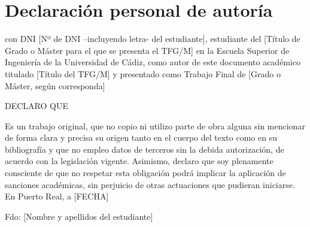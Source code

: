 \newpage{\ }
\thispagestyle{empty}

\clearpage\setcounter{page}{-1} %

\chapter*{Declaración personal de autoría}

\vspace{15mm}

 con DNI [Nº de DNI –incluyendo letra- del estudiante], estudiante del [Título de Grado o Máster para el que se presenta el TFG/M] en la Escuela Superior de Ingeniería de la Universidad de Cádiz, como autor de este documento académico titulado [Título del TFG/M] y presentado como Trabajo Final de [Grado o Máster, según corresponda]


\vspace{15mm}


DECLARO QUE \\
\vspace{1mm}

\noindent Es un trabajo original, que no copio ni utilizo parte de obra alguna sin mencionar de forma clara y precisa su origen tanto en el cuerpo del texto como en su bibliografía y que no empleo datos de terceros sin la debida autorización, de acuerdo con la legislación vigente. Asimismo, declaro que soy plenamente consciente de que no respetar esta obligación podrá implicar  la  aplicación de sanciones académicas, sin perjuicio de otras actuaciones que pudieran iniciarse.
En Puerto Real, a [FECHA] 

\vspace{15mm}
Fdo: [Nombre y apellidos del estudiante]\hspace{10cm}
